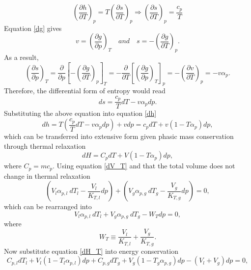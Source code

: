 \begin{equation}
\left(\frac{\partial h}{\partial T}\right)_p = T \left(\frac{\partial s}{\partial T}\right)_p \Rightarrow \left(\frac{\partial s}{\partial T}\right)_p = \frac{c_p}{T}
\end{equation}
Equation \eqref{dg} gives
\begin{equation}
v=\left(\frac{\partial g}{\partial p}\right)_T \quad and \quad s=-\left(\frac{\partial g}{\partial T}\right)_p.
\end{equation}
As a result,
\begin{equation}
\left(\frac{\partial s}{\partial p}\right)_T = \frac{\partial}{\partial p}\left[ - \left(\frac{\partial g}{\partial T}\right)_p \right]_T = -\frac{\partial}{\partial T}\left[ \left(\frac{\partial g}{\partial p}\right)_T \right]_p = -\left(\frac{\partial v}{\partial T}\right)_p = -v \alpha_p.
\end{equation}
Therefore, the differential form of entropy would read
\begin{equation}
ds=\frac{c_p}{T} dT - v \alpha_p dp.
\end{equation}
Substituting the above equation into equation \eqref{dh}
\begin{equation}
dh = T \left( \frac{c_p}{T} dT - v \alpha_p dp \right) + vdp = c_p dT + v \left( 1 - T \alpha_p \right) dp,
\end{equation}
which can be transferred into extensive form given phasic mass conservation through thermal relaxation
\begin{equation}\label{dH_T}
dH = C_p dT + V \left( 1 - T \alpha_p \right) dp,
\end{equation}
where $C_p = m c_p$.
Using equation \eqref{dV_T} and that the total volume does not change in thermal relaxation
\begin{equation}
\left( V_l \alpha_{p,l}\ dT_l - \frac{V_l}{K_{T,l}} dp \right)
+\left( V_g \alpha_{p,g}\ d T_g - \frac{V_g}{K_{T,g}} dp\right) = 0,
\end{equation}
which can be rearranged into
\begin{equation}\label{sys_T_1}
V_l \alpha_{p,l}\ dT_l + V_g \alpha_{p,g}\ d T_g - W_T dp = 0,
\end{equation}
where
\begin{equation}
W_T \equiv \frac{V_l}{K_{T,l}} + \frac{V_g}{K_{T,g}}.
\end{equation}
Now substitute equation \eqref{dH_T} into energy conservation
\begin{equation}
C_{p,l} dT_l + V_l \left( 1 - T_l \alpha_{p,l} \right) dp + C_{p,g} dT_g + V_g \left( 1 - T_g \alpha_{p,g} \right) dp - (V_l + V_g) dp = 0,
\end{equation}
